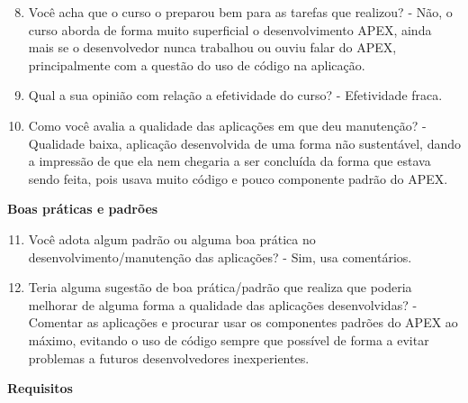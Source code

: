\begin{apendicesenv}
\begin{enumerate}
	\setcounter{enumi}{7}
	\item Você acha que o curso o preparou bem para as tarefas que realizou?\newline
	- Não, o curso aborda de forma muito superficial o desenvolvimento APEX, ainda mais se o desenvolvedor nunca trabalhou ou ouviu falar do APEX, principalmente com a questão do uso de código na aplicação.
	\item Qual a sua opinião com relação a efetividade do curso?\newline
	- Efetividade fraca.
	\item Como você avalia a qualidade das aplicações em que deu manutenção?\newline
	- Qualidade baixa, aplicação desenvolvida de uma forma não sustentável, dando a impressão de que ela nem chegaria a ser concluída da forma que estava sendo feita, pois usava muito código e pouco componente padrão do APEX.
\end{enumerate}

\textbf{Boas práticas e padrões}

\begin{enumerate}
	\setcounter{enumi}{10}
	\item Você adota algum padrão ou alguma boa prática no desenvolvimento/manutenção das
	aplicações?\newline
	- Sim, usa comentários.
	\item Teria alguma sugestão de boa prática/padrão que realiza que poderia melhorar de
	alguma forma a qualidade das aplicações desenvolvidas?\newline
	- Comentar as aplicações e procurar usar os componentes padrões do APEX ao máximo, evitando o uso de código sempre que possível de forma a evitar problemas a futuros desenvolvedores inexperientes.
\end{enumerate}

\textbf{Requisitos}


\end{apendicesenv}
